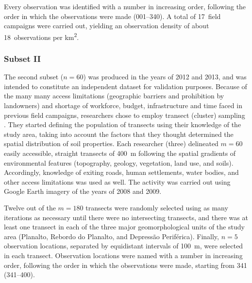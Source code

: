 Every observation was identified with a number in increasing order, following the order in which 
the observations were made (\num{001}--\num{340}). A total of \num{17}~field campaigns were carried out,
yielding an observation density of about \num{18}~observations per \si{\kilo\metre\squared}.

\tocless\subsubsection{Subset II}

The second subset ($n = 60$) was produced in the years of \num{2012} and \num{2013}, and was intended to 
constitute an independent dataset for validation purposes. Because of the many many access limitations 
(geographic barriers and prohibition by landowners) and shortage of workforce, budget, infrastructure and 
time faced in previous field campaigns, researchers chose to employ transect (cluster) sampling 
\cite{MiguelEtAl2012,Moura-BuenoEtAl2012,Samuel-RosaEtAl2013}. They started defining the population of 
transects using their knowledge of the study area, taking into account the factors that they thought 
determined the spatial distribution of soil properties. Each researcher (three) delineated $m = 60$ easily 
accessible, straight transects of \SI{400}{\metre} following the spatial gradients of environmental features 
(topography, geology, vegetation, land use, and soils). Accordingly, knowledge of exiting roads, human 
settlements, water bodies, and other access limitations was used as well. The activity was carried out using 
Google Earth\textregistered{} imagery of the years of \num{2008} and \num{2009}.


Twelve out of the $m = 180$ transects were randomly selected using as many iterations as necessary until 
there were no intersecting transects, and there was at least one transect in each of the three major 
geomorphological units of the study area (Planalto, Rebordo do Planalto, and Depressão Periférica). 
Finally, $n = 5$ observation locations, separated by equidistant intervals of \SI{100}{\metre}, were 
selected in each transect. Observation locations were named with a number in increasing order, 
following the order in which the observations were made, starting from \num{341} (\num{341}--\num{400}).

